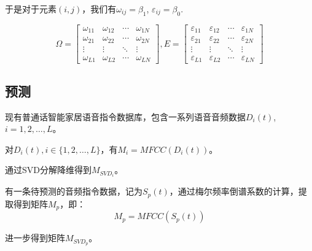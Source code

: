 \documentclass[lang=cn,cite=super]{elegantpaper}
\begin{document}
于是对于元素$(i,j)$，我们有$\omega_{ij} = \beta_1$, $\varepsilon_{ij} = \beta_0$.

\begin{equation}
    \Omega = \begin{bmatrix}
        \omega_{11} & \omega_{12} & \cdots & \omega_{1N}\\
        \omega_{21} & \omega_{22} & \cdots & \omega_{2N}\\
        \vdots & \vdots & \ddots & \vdots \\
        \omega_{L1} & \omega_{L2} & \cdots & \omega_{LN}
    \end{bmatrix}, 
    E = \begin{bmatrix}
        \varepsilon_{11} & \varepsilon_{12} & \cdots & \varepsilon_{1N}\\
        \varepsilon_{21} & \varepsilon_{22} & \cdots & \varepsilon_{2N}\\
        \vdots & \vdots & \ddots & \vdots \\
        \varepsilon_{L1} & \varepsilon_{L2} & \cdots & \varepsilon_{LN}
    \end{bmatrix}
\end{equation}


\subsection{预测}
现有普通话智能家居语音指令数据库，包含一系列语音音频数据$D_i(t)$, $i = 1, 2, \ldots, L$。

对$D_i(t), i\in \{1,2,\ldots, L\}$，有$M_i = MFCC(D_i(t))$。

通过SVD分解降维得到$M_{SVD_i}$。

有一条待预测的音频指令数据，记为$S_p(t)$，通过梅尔频率倒谱系数的计算，提取得到矩阵$M_p$，即：
\begin{equation}
    M_p = MFCC(S_p(t))
\end{equation}

进一步得到矩阵$M_{SVD_p}$。
\end{document}
